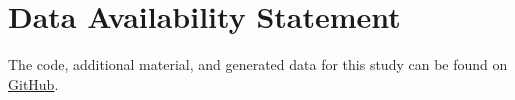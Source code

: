 \documentclass[utf8]{FrontiersinVancouver}
\begin{document}
\section*{Data Availability Statement}
The code, additional material, and generated data for this study can be found on \href{https://github.com/MvanSteenbergen/MasterThesisRQA}{GitHub}.







\end{document}
